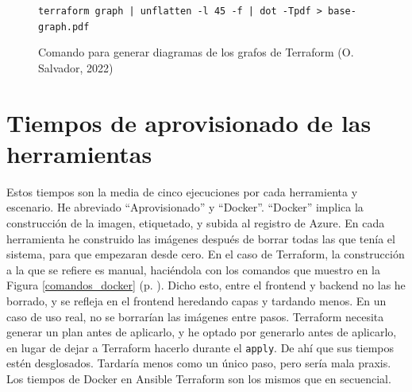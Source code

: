 \documentclass[11pt]{article}
\begin{document}
\begin{flushleft}
    \begin{figure}[htb]
        \centering
        \footnotesize
        \texttt{terraform graph | unflatten -l 45 -f  | dot  -Tpdf  > base-graph.pdf} 
        \caption{Comando para generar diagramas de los grafos de Terraform (O. Salvador, 2022)}
    \end{figure}



\bigskip

\section{Tiempos de aprovisionado de las herramientas}
\label{anexo:tiempos}
Estos tiempos son la media de cinco ejecuciones por cada herramienta y escenario. He abreviado ``Aprovisionado'' y ``Docker''. ``Docker'' implica la construcción de la imagen, etiquetado, y subida al registro de Azure. En cada herramienta he construido las imágenes después de borrar todas las que tenía el sistema, para que empezaran desde cero. En el caso de Terraform, la construcción a la que se refiere es manual, haciéndola con los comandos que muestro en la Figura \ref{comandos_docker} (p. \pageref{comandos_docker}). Dicho esto, entre el frontend y backend no las he borrado, y se refleja en el frontend heredando capas y tardando menos. En un caso de uso real, no se borrarían las imágenes entre pasos. Terraform necesita generar un plan antes de aplicarlo, y he optado por generarlo antes de aplicarlo, en lugar de dejar a Terraform hacerlo durante el \texttt{apply}. De ahí que sus tiempos estén desglosados. Tardaría menos como un único paso, pero sería mala praxis. Los tiempos de Docker en Ansible Terraform son los mismos que en secuencial.
\linebreak


\end{flushleft}
\end{document}

